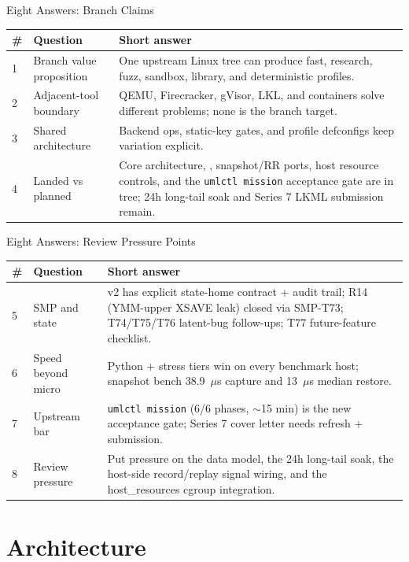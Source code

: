 \documentclass[aspectratio=169,11pt]{beamer}
\begin{document}
\begin{frame}{Eight Answers: Branch Claims}
\small
\begin{tabularx}{\textwidth}{@{}p{}p{}X@{}}
\toprule
\# & Question & Short answer \\
\midrule
1 & Branch value proposition & One upstream Linux tree can produce fast, research, fuzz, sandbox, library, and deterministic profiles. \\
2 & Adjacent-tool boundary & QEMU, Firecracker, gVisor, LKL, and containers solve different problems; none is the branch target. \\
3 & Shared architecture & Backend ops, static-key gates, and profile defconfigs keep variation explicit. \\
4 & Landed vs planned & Core architecture, \KVMvTwo{}, snapshot/RR ports, host resource controls, and the \texttt{umlctl mission} acceptance gate are in tree; 24h long-tail soak and Series 7 LKML submission remain. \\
\bottomrule
\end{tabularx}
\end{frame}

\begin{frame}{Eight Answers: Review Pressure Points}
\small
\begin{tabularx}{\textwidth}{@{}p{}p{}X@{}}
\toprule
\# & Question & Short answer \\
\midrule
5 & SMP and state & v2 has explicit state-home contract + audit trail; R14 (YMM-upper XSAVE leak) closed via SMP-T73; T74/T75/T76 latent-bug follow-ups; T77 future-feature checklist. \\
6 & Speed beyond micro & Python + stress tiers win on every benchmark host; snapshot bench 38.9~$\mu$s capture and 13~$\mu$s median restore. \\
7 & Upstream bar & \texttt{umlctl mission} (6/6 phases, $\sim$15 min) is the new acceptance gate; Series 7 cover letter needs refresh + submission. \\
8 & Review pressure & Put pressure on the data model, the 24h long-tail soak, the host-side record/replay signal wiring, and the host\_resources cgroup integration. \\
\bottomrule
\end{tabularx}
\end{frame}

\section{Architecture}
\end{document}
